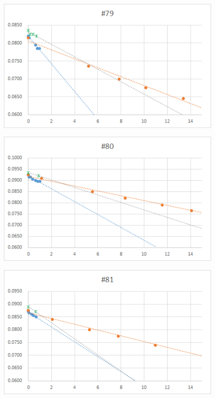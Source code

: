   \clearpage
  \begin{figure}[htbp]
    \centering
       \includegraphics[width=120mm]{vol_079.png}
  \end{figure}
  \begin{figure}[htbp]
    \centering
       \includegraphics[width=120mm]{vol_080.png}
  \end{figure}
  \begin{figure}[htbp]
    \centering
       \includegraphics[width=120mm]{vol_081.png}
  \end{figure}
